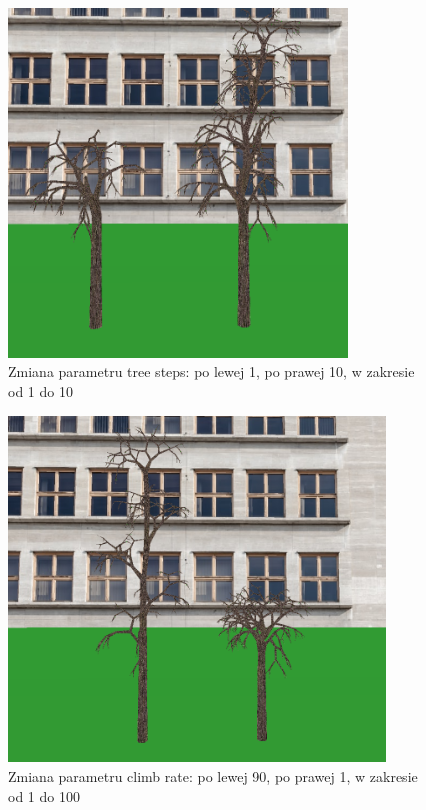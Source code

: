 \documentclass[a4paper,twoside,12pt]{report}
\begin{document}
\begin{figure}[H]
	\centering\includegraphics[width=9cm]{grafika/params/TreeSteps.png}
	\caption{Zmiana parametru tree steps: po lewej 1, po prawej 10, w zakresie od 1 do 10}
    \label{fig:treeSteps}
\end{figure}

\begin{figure}[H]
	\centering\includegraphics[width=10cm]{grafika/params/ClimbRate.png}
	\caption{Zmiana parametru climb rate: po lewej 90, po prawej 1, w zakresie od 1 do 100}
    \label{fig:climbRate}
\end{figure}
\end{document}
